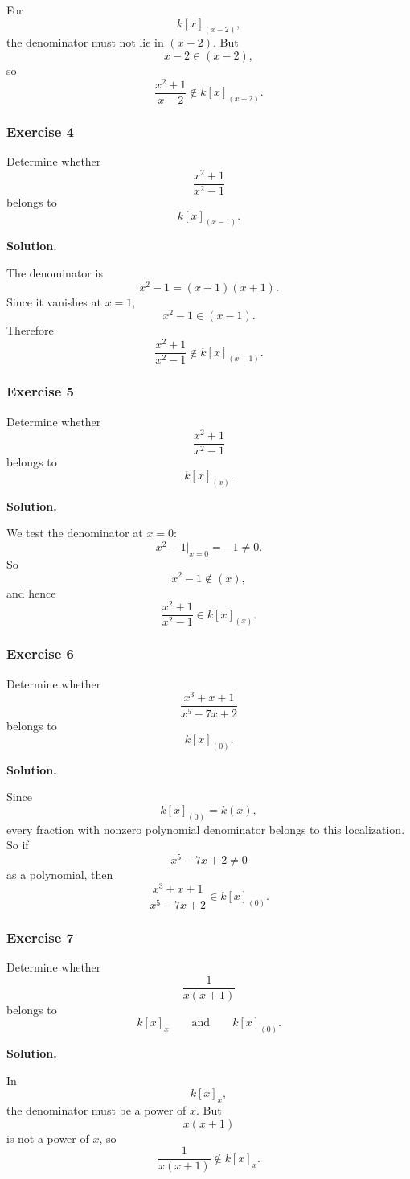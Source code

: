 \documentclass[12pt,a4paper]{article}
\theoremstyle{notespace}
\theoremstyle{definition}
\begin{document}
For
\[
k[x]_{(x-2)},
\]
the denominator must not lie in \((x-2)\). But
\[
x-2\in (x-2),
\]
so
\[
\frac{x^2+1}{x-2}\notin k[x]_{(x-2)}.
\]

\subsubsection{Exercise 4}

Determine whether
\[
\frac{x^2+1}{x^2-1}
\]
belongs to
\[
k[x]_{(x-1)}.
\]

\textbf{Solution.}

The denominator is
\[
x^2-1=(x-1)(x+1).
\]
Since it vanishes at \(x=1\),
\[
x^2-1\in (x-1).
\]
Therefore
\[
\frac{x^2+1}{x^2-1}\notin k[x]_{(x-1)}.
\]

\subsubsection{Exercise 5}

Determine whether
\[
\frac{x^2+1}{x^2-1}
\]
belongs to
\[
k[x]_{(x)}.
\]

\textbf{Solution.}

We test the denominator at \(x=0\):
\[
x^2-1\big|_{x=0}=-1\neq 0.
\]
So
\[
x^2-1\notin (x),
\]
and hence
\[
\frac{x^2+1}{x^2-1}\in k[x]_{(x)}.
\]

\subsubsection{Exercise 6}

Determine whether
\[
\frac{x^3+x+1}{x^5-7x+2}
\]
belongs to
\[
k[x]_{(0)}.
\]

\textbf{Solution.}

Since
\[
k[x]_{(0)}=k(x),
\]
every fraction with nonzero polynomial denominator belongs to this localization. So if
\[
x^5-7x+2\neq 0
\]
as a polynomial, then
\[
\frac{x^3+x+1}{x^5-7x+2}\in k[x]_{(0)}.
\]

\subsubsection{Exercise 7}

Determine whether
\[
\frac{1}{x(x+1)}
\]
belongs to
\[
k[x]_x
\qquad\text{and}\qquad
k[x]_{(0)}.
\]

\textbf{Solution.}

In
\[
k[x]_x,
\]
the denominator must be a power of \(x\). But
\[
x(x+1)
\]
is not a power of \(x\), so
\[
\frac{1}{x(x+1)}\notin k[x]_x.
\]
\end{document}
